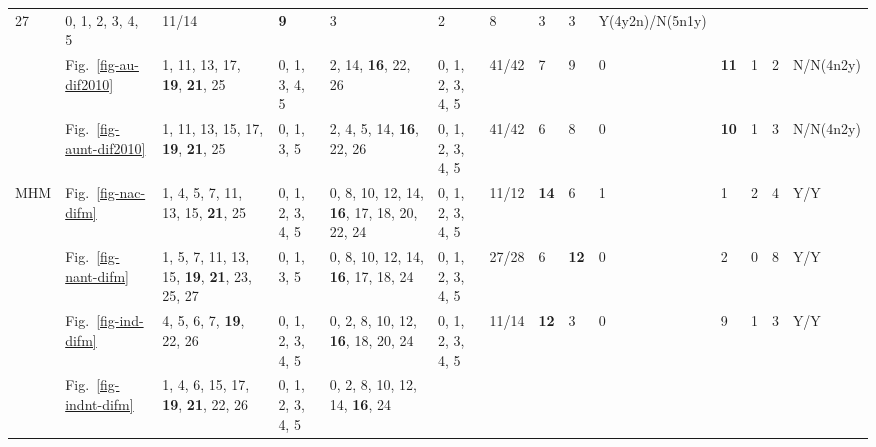\begin{table*}
{\begin{tabular}{l|l|l|l|l|l|l|l|l|l|l|l|l|l}
{{  27}} & \multirow{2}{*}{\parbox{1cm}{0, 1, 2, 3, 4, 5}} & 11/14 & \textbf{9} & 3 & 2 &
  8 & 3 & 3 & Y(4y2n)/N(5n1y) \\ \\ \cline{2-14}
& Fig.~\ref{fig-au-dif2010} & \multirow{2}{*}{\parbox{2cm}{1, 11, 13, 17,
\textbf{19}, \textbf{21}, 25}} & \multirow{2}{*}{\parbox{1cm}{0, 1, 3, 4, 5}} &
  \multirow{2}{*}{\parbox{2cm}{2, 14, \textbf{16}, 22, 26}} &
  \multirow{2}{*}{\parbox{1cm}{0, 1, 2, 3, 4, 5}} & 41/42 & 7 & 9 & 0 & \textbf{11} & 1
  & 2 & N/N(4n2y) \\ \\ \cline{2-14}
& Fig.~\ref{fig-aunt-dif2010} & \multirow{2}{*}{\parbox{2cm}{1, 11, 13, 15, 17,
  \textbf{19}, \textbf{21}, 25}} & \multirow{2}{*}{\parbox{1cm}{0, 1, 3, 5}} &
  \multirow{2}{*}{\parbox{2cm}{2, 4, 5, 14, \textbf{16}, 22, 26}} &
  \multirow{2}{*}{\parbox{1cm}{0, 1, 2, 3, 4, 5}} & 41/42 & 6 & 8 & 0 & \textbf{10} & 1
  & 3 & N/N(4n2y) \\ \\ \hline
\multirow{12}{*}{MHM}
& Fig.~\ref{fig-nac-difm} & \multirow{2}{*}{\parbox{2cm}{1, 4, 5, 7, 11, 13, 15,
  \textbf{21}, 25}} & \multirow{2}{*}{\parbox{1cm}{0, 1, 2, 3, 4, 5}} &
  \multirow{2}{*}{\parbox{2.2cm}{0, 8, 10, 12, 14, \textbf{16}, 17, 18, 20, 22, 24}} &
  \multirow{2}{*}{\parbox{1cm}{0, 1, 2, 3, 4, 5}} & 11/12 & \textbf{14} & 6 & 1 & 1 & 2
  & 4 & Y/Y \\ \\ \cline{2-14}
& Fig.~\ref{fig-nant-difm} & \multirow{2}{*}{\parbox{2cm}{1, 5, 7, 11, 13, 15,
  \textbf{19}, \textbf{21}, 23, 25, 27}} &
  \multirow{2}{*}{\parbox{1cm}{0, 1, 3, 5}} &
  \multirow{2}{*}{\parbox{2.4cm}{0, 8, 10, 12, 14, \textbf{16}, 17, 18, 24}} &
  \multirow{2}{*}{\parbox{1cm}{0, 1, 2, 3, 4, 5}} & 27/28 & 6 & \textbf{12} & 0 & 2 & 0
  & 8 & Y/Y \\ \\ \cline{2-14}
& Fig.~\ref{fig-ind-difm} & \multirow{2}{*}{\parbox{2cm}{4, 5, 6, 7, \textbf{19}, 22, 26}} &
  \multirow{2}{*}{\parbox{1cm}{0, 1, 2, 3, 4, 5}} &
  \multirow{2}{*}{\parbox{2.4cm}{0, 2, 8, 10, 12, \textbf{16}, 18, 20, 24}} &
  \multirow{2}{*}{\parbox{1cm}{0, 1, 2, 3, 4, 5}} & 11/14 & \textbf{12} & 3 & 0 & 9 & 1
  & 3 & Y/Y \\ \\ \cline{2-14}
& Fig.~\ref{fig-indnt-difm} & \multirow{2}{*}{\parbox{2cm}{1, 4, 6, 15, 17,
  \textbf{19}, \textbf{21}, 22, 26}} & \multirow{2}{*}{\parbox{1cm}{0, 1, 2, 3, 4, 5}} &
  \multirow{2}{*}{\parbox{2.4cm}{0, 2, 8, 10, 12, 14, \textbf{16}, 24}} &

\end{tabular}}
\end{table*}
